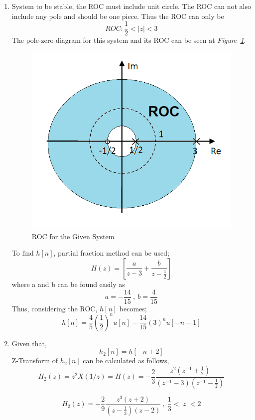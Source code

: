 \documentclass[a4paper,12pt]{article}
\begin{document}
\begin{enumerate}
		\begin{enumerate}
			\item System to be stable, the ROC must include unit circle. The ROC can not also include any pole and should be one piece. Thus the ROC can only be
			$$\boxed{ ROC: \frac{1}{2}<|z|<3 }$$	
			The pole-zero diagram for this system and its ROC can be seen at \textit{Figure~\ref{fig:Q5a}}.
			\begin{figure}[H]
				\center
				\setlength{\unitlength}{\textwidth} 
				\includegraphics[width=0.675\unitlength]{images/Q5ak}
				\caption{\label{fig:Q5a} ROC for the Given System}
			\end{figure}	
			
			To find $h[n]$, partial fraction method can be used;	
			$$ H(z)=\left[\frac{ a}{z-3}+\frac{b}{z-\frac{1}{2}}\right] $$
			where a and b can be found easily as
			$$ \boxed{a=-\frac{14}{15}} \ , \ \boxed{b=\frac{4}{15}}$$
			Thus, considering the ROC, $h[n]$ becomes;
			$$\boxed{ h[n]= \frac{4}{5}{(\frac{1}{2})}^n u[n]-\frac{14}{15}{(3)}^n u[-n-1] }$$
			\item Given that,
				$$ h_2[n]=h[-n+2] $$
				Z-Transform of $h_2[n]$ can be calculated as follows,
				$$ H_2(z)=z^2X(1/z)=H(z)=-\frac{2}{3}\frac{ z^2(z^{-1}+\frac{1}{2})}{(z^{-1}-3)(z^{-1}-\frac{1}{2})}$$
				
				$$\boxed{H_2(z)=-\frac{2}{9}\frac{ z^3(z+2)}{(z-\frac{1}{3})(z-2)} \ , \ \frac{1}{3}<|z|<2	}$$
				

\end{enumerate}
\end{enumerate}
\end{document}
